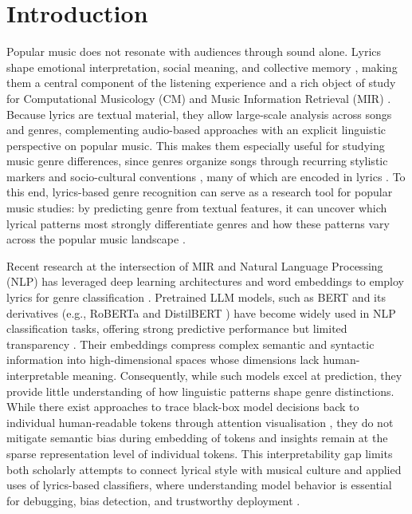 \documentclass{article}
\begin{document}
\section{Introduction}\label{sec:introduction}
Popular music does not resonate with audiences through sound alone. Lyrics shape emotional interpretation, social meaning, and collective memory \cite{davis1985pop, frithWhySongsHave1986}, making them a central component of the listening experience and a rich object of study for Computational Musicology (CM) and Music Information Retrieval (MIR) \cite{watanabeLyricsInformationProcessing2020}. Because lyrics are textual material, they allow large-scale analysis across songs and genres, complementing audio-based approaches with an explicit linguistic perspective on popular music. This makes them especially useful for studying music genre differences, since genres organize songs through recurring stylistic markers and socio-cultural conventions \cite{fabbriTheoryMusicalGenres1982}, many of which are encoded in lyrics \cite{paradacabaleiroSongLyricsHave2024, carboneStatusMarkersPopular2024, bettiLargeScaleAnalysis2023, schedlGenreDifferencesSong2019, squiresGenreLinguisticExpectation2019}. To this end, lyrics-based genre recognition can serve as a research tool for popular music studies: by predicting genre from textual features, it can uncover which lyrical patterns most strongly differentiate genres and how these patterns vary across the popular music landscape \cite{tsaptsinosLyricsBasedMusicGenre2017, mayerRHYMESTYLEFEATURES2008a}.

Recent research at the intersection of MIR and Natural Language Processing (NLP) has leveraged deep learning architectures and word embeddings to employ lyrics for genre classification \cite{liMusicGenreClassification2023,akalpLanguageRepresentationModels2021, dearaujolimaBrazilianLyricsBasedMusic2020, tsaptsinosLyricsBasedMusicGenre2017}. Pretrained LLM models, such as BERT \cite{devlinBERTPretrainingDeep2019} and its derivatives (e.g., RoBERTa \cite{liuRoBERTaRobustlyOptimized2019} and DistilBERT \cite{sanhDistilBERTDistilledVersion2020}) have become widely used in NLP classification tasks, offering strong predictive performance but limited transparency \cite{gardaziBERTApplicationsNatural2025}. Their embeddings compress complex semantic and syntactic information into high-dimensional spaces whose dimensions lack human-interpretable meaning. Consequently, while such models excel at prediction, they provide little understanding of how linguistic patterns shape genre distinctions. While there exist approaches to trace black-box model decisions back to individual human-readable tokens through attention visualisation \cite{skrljExploringNeuralLanguage2021,tsaptsinosLyricsBasedMusicGenre2017}, they do not mitigate semantic bias during embedding of tokens \cite{muzambiMultidimensionalMIRAnalysis2026, benderDangersStochasticParrots2021} and insights remain at the sparse representation level of individual tokens. This interpretability gap limits both scholarly attempts to connect lyrical style with musical culture and applied uses of lyrics-based classifiers, where understanding model behavior is essential for debugging, bias detection, and trustworthy deployment \cite{sturmSimpleMethodDetermine2014,rudinStopExplainingBlack2019}.
\end{document}
